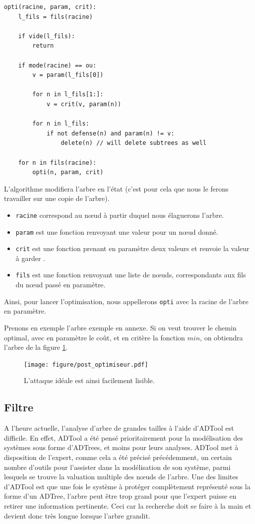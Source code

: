 		\begin{lstlisting}
opti(racine, param, crit):
	l_fils = fils(racine)

	if vide(l_fils):
		return

	if mode(racine) == ou:
		v = param(l_fils[0])

		for n in l_fils[1:]:
			v = crit(v, param(n))

		for n in l_fils:
			if not defense(n) and param(n) != v:
				delete(n) // will delete subtrees as well
	
	for n in fils(racine):
		opti(n, param, crit)
		\end{lstlisting}

		L'algorithme modifiera l'arbre en l'état (c'est pour cela que nous le ferons travailler sur une copie de l'arbre).
		\begin{itemize}
			\item \verb|racine| correspond au nœud à partir duquel nous élaguerons l'arbre.
			\item \verb|param| est une fonction renvoyant une valeur pour un nœud donné.
			\item \verb|crit| est une fonction prenant en paramètre deux valeurs et renvoie la valeur à \og garder \fg.
			\item \verb|fils| est une fonction renvoyant une liste de nœuds, correspondants aux fils du nœud passé en paramètre.
		\end{itemize}
		Ainsi, pour lancer l'optimisation, nous appellerons \verb|opti| avec la racine de l'arbre en paramètre.

		Prenons en exemple l'arbre exemple en annexe.
		Si on veut trouver le chemin optimal, avec en paramètre le coût, et en critère la fonction $min$, on obtiendra l'arbre de la figure \ref{fig:arbre_post_opti}.

		\begin{figure}
			\centering
			\texttt{[image: figure/post\_optimiseur.pdf]}
			\caption{L'attaque idéale est ainsi facilement lisible.}
			\label{fig:arbre_post_opti}
		\end{figure}


	\subsection{Filtre}

		A l'heure actuelle, l'analyse d'arbre de grandes tailles à l'aide d'ADTool est difficile. 
		En effet, ADTool a été pensé prioritairement pour la modélisation des systèmes sous forme d'ADTrees, et moins pour leurs analyses. 
		ADTool met à disposition de l'expert, comme cela a été précisé précédemment, un certain nombre d'outils pour l'assister dans la modélisation de son système, parmi lesquels se trouve la valuation multiple des nœuds de l'arbre. 
		Une des limites d'ADTool est que une fois le système à protéger complètement représenté sous la forme d'un ADTree, l'arbre peut être trop grand pour que l'expert puisse en retirer une information pertinente. Ceci car la recherche doit se faire à la main et devient donc très longue lorsque l'arbre grandit. 


